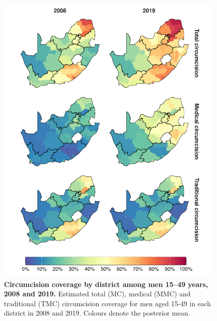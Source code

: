 \documentclass{article}
\begin{document}
\begin{figure}[H]
  \centering
  \includegraphics[width = 5.2in]{Figures/paper/Figure5.pdf}
  \caption{{\bf Circumcision coverage by district among men 15--49 years, 2008 and 2019.}
    Estimated total (MC), medical (MMC) and traditional (TMC) circumcision coverage for men aged 15-49 in each district in 2008 and 2019. Colours denote the posterior mean.}
  \label{fig::district1549prevmap}
\end{figure}

\end{document}
